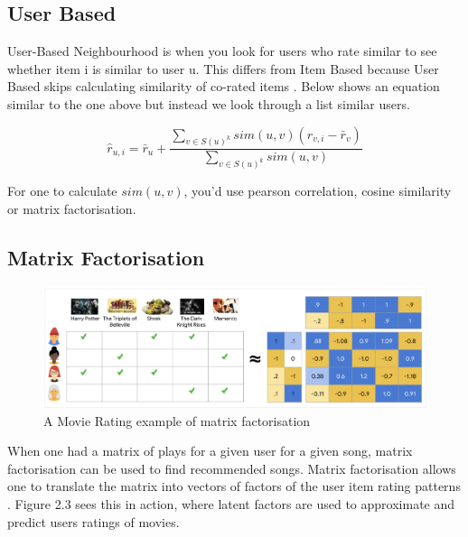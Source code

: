 \subsection{User Based}

User-Based Neighbourhood is when you look for users who rate similar to see whether item i is similar to user u. This differs from Item Based because User Based skips calculating similarity of co-rated items \citep{pinela_recommender_2017}. Below shows an equation similar to the one above but instead we look through a list similar users.

\begin{equation}
	\hat{r} _{u,i} = \bar{r}_{u} + \frac{ \sum _{v \in S(u)^{k}} sim(u ,v) ( r_{v, i} - \bar{r}_{v})}{\sum _{v \in S(u)^{k}} sim(u , v)}
\end{equation}

For one to calculate $sim(u , v)$, you'd use pearson correlation, cosine similarity or matrix factorisation.

\subsection{Matrix Factorisation}

\begin{figure}[H]
	\includegraphics[scale=0.45]{images/matrix_factorisation_example}
	\centering
	\caption{A Movie Rating example of matrix factorisation  \citep{httpsdevelopersgooglecom_matrix_2023}} 
	\label{fig:figure}
\end{figure}

When one had a matrix of plays for a given user for a given song, matrix factorisation can be used to find recommended songs. Matrix factorisation allows one to translate the matrix into vectors of factors of the user item rating patterns \citep{koren_matrix_2009}. Figure 2.3 sees this in action, where latent factors are used to approximate and predict users ratings of movies.

